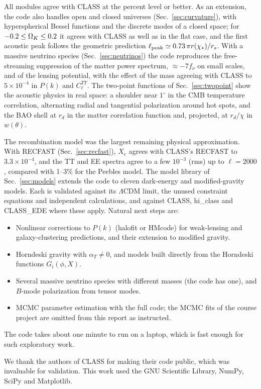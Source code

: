 All modules agree with CLASS at the percent level or better. As an extension, the code also handles open and
closed universes (Sec.~\ref{sec:curvature}), with hyperspherical Bessel functions and the discrete modes of a closed
space; for $-0.2\le\Omega_K\le0.2$ it agrees with CLASS as well as in the flat case, and the first acoustic peak
follows the geometric prediction $\ell_{\rm peak}\simeq0.73\,\pi r(\chi_*)/r_s$. With a massive neutrino species
(Sec.~\ref{sec:neutrinos}) the code reproduces the free-streaming suppression of the matter power spectrum,
$\approx-7f_\nu$ on small scales, and of the lensing potential, with the effect of the mass agreeing with CLASS to
$5\times10^{-4}$ in $P(k)$ and $C_\ell^{TT}$.
The two-point functions of Sec.~\ref{sec:twopoint} show the acoustic physics in real space: a shoulder near $1^\circ$
in the CMB temperature correlation, alternating radial and tangential polarization around hot spots, and the BAO
shell at $r_d$ in the matter correlation function and, projected, at $r_d/\chi$ in $w(\theta)$.

The recombination model was the largest remaining physical approximation. With RECFAST (Sec.~\ref{sec:recfast}),
$X_e$ agrees with CLASS's RECFAST to $3.3\times10^{-4}$, and the TT and EE spectra agree to a few
$10^{-3}$ (rms) up to $\ell=2000$, compared with 1--3\% for the Peebles model. The model library of
Sec.~\ref{sec:models} extends the code to eleven dark-energy and modified-gravity models. Each is validated against
its $\Lambda$CDM limit, the unused constraint equations and independent calculations, and against CLASS, hi\_class
and CLASS\_EDE where these apply. Natural next steps are:
\begin{itemize}
\item Nonlinear corrections to $P(k)$ (halofit or HMcode) for weak-lensing and galaxy-clustering predictions, and
      their extension to modified gravity.
\item Horndeski gravity with $\alpha_T\neq0$, and models built directly from the Horndeski functions $G_i(\phi,X)$.
\item Several massive neutrino species with different masses (the code has one), and $B$-mode polarization from
      tensor modes.
\item MCMC parameter estimation with the full code; the MCMC fits of the course project are omitted from this report
      as instructed.
\end{itemize}
The code takes about one minute to run on a laptop, which is fast enough for such exploratory work.

\begin{acknowledgments}
We thank the authors of CLASS for making their code public, which was invaluable for validation. This work used the
GNU Scientific Library, NumPy, SciPy and Matplotlib.
\end{acknowledgments}

